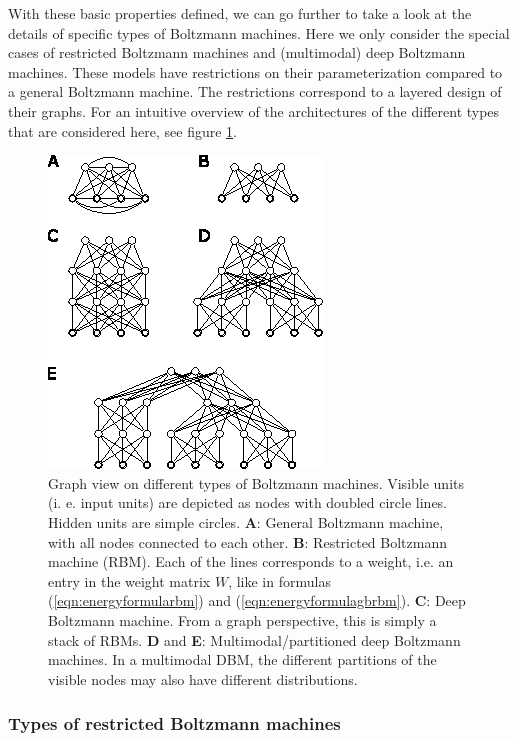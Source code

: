 \documentclass[12pt]{article}
\begin{document}
With these basic properties defined, we can go further to take a look at the details of specific types of Boltzmann machines.
Here we only consider the special cases of restricted Boltzmann machines and (multimodal) deep Boltzmann machines.
These models have restrictions on their parameterization compared to a general Boltzmann machine.
The restrictions correspond to a layered design of their graphs.
For an intuitive overview of the architectures of the different types that are considered here, see figure \ref{fig:bmsoverview}.

\begin{figure}[h]

   \centering
   \includegraphics[scale=3.]{images/BMsOverview.eps}
   \caption{Graph view on different types of Boltzmann machines. Visible units (i. e. input units) are depicted as nodes with doubled circle lines. Hidden units are simple circles.
 {\bf A}: General Boltzmann machine, with all nodes connected to each other. {\bf B}: Restricted Boltzmann machine (RBM). Each of the lines corresponds to a weight, i.e. an entry in the weight matrix $W$, like in formulas (\ref{eqn:energyformularbm}) and (\ref{eqn:energyformulagbrbm}).  
{\bf C}: Deep Boltzmann machine. From a graph perspective, this is simply a stack of RBMs.
{\bf D} and {\bf E}: Multimodal/partitioned deep Boltzmann machines. In a multimodal DBM, the different partitions of the visible nodes may also have different distributions.}
   \label{fig:bmsoverview}
 \end{figure}


\subsubsection{Types of restricted Boltzmann machines}\label{rbmtypes}
\end{document}
